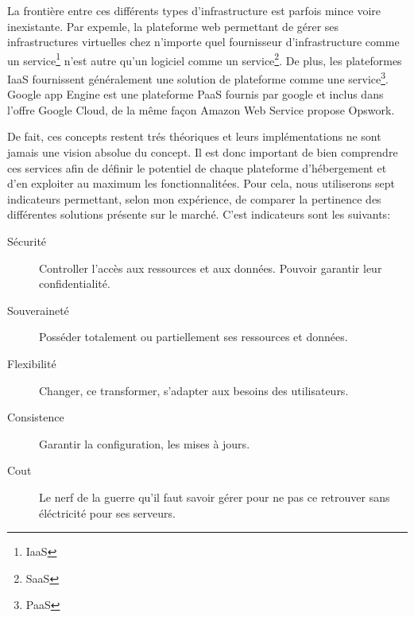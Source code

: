 \documentclass[11pt, a4paper ]{article}
\begin{document}
\begin{spacing}{1.5}
La frontière entre ces différents types d'infrastructure est parfois mince voire inexistante. Par expemle, la plateforme web permettant de gérer ses infrastructures virtuelles chez n'importe quel fournisseur d'infrastructure comme un service\footnote{IaaS} n'est autre qu'un logiciel comme un service\footnote{SaaS}. De plus, les plateformes IaaS fournissent généralement une solution de plateforme comme une service\footnote{PaaS}. Google app Engine est une plateforme PaaS fournis par google et inclus dans l'offre Google Cloud, de la même façon Amazon Web Service propose Opswork.

De fait, ces concepts restent trés théoriques et leurs implémentations ne sont jamais une vision absolue du concept. Il est donc important de bien comprendre ces services afin de définir le potentiel de chaque plateforme d'hébergement et d'en exploiter au maximum les fonctionnalitées.
Pour cela, nous utiliserons sept indicateurs permettant, selon mon expérience, de comparer la pertinence des différentes solutions présente sur le marché. C'est indicateurs sont les suivants: 

\begin{description}

	\item[Sécurité]
		Controller l'accès aux ressources et aux données. Pouvoir garantir leur confidentialité.

	\item[Souveraineté]
		Posséder totalement ou partiellement ses ressources et données.

	\item[Flexibilité]
		Changer, ce transformer, s'adapter aux besoins des utilisateurs.

	\item[Consistence]
		Garantir la configuration, les mises à jours.

	\item[Cout]
		Le nerf de la guerre qu'il faut savoir gérer pour ne pas ce retrouver sans éléctricité pour ses serveurs.


\end{description}
\end{spacing}
\end{document}
